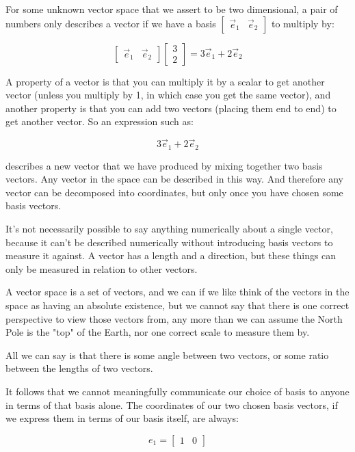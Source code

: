 For some unknown vector space that we assert to be two dimensional, a pair of numbers only describes a vector if we have a basis $\begin{bmatrix}\vec{e}_1 & \vec{e}_2\end{bmatrix}$ to multiply by:

$$
\begin{bmatrix}\vec{e}_1 & \vec{e}_2\end{bmatrix}
\begin{bmatrix}3 \\ 2\end{bmatrix}
= 3\vec{e}_1 + 2\vec{e}_2
$$

A property of a vector is that you can multiply it by a scalar to get another vector (unless you multiply by 1, in which case you get the same vector), and another property is that you can add two vectors (placing them end to end) to get another vector. So an expression such as:

$$3\vec{e}_1 + 2\vec{e}_2$$

describes a new vector that we have produced by mixing together two basis vectors. Any vector in the space can be described in this way. And therefore any vector can be decomposed into coordinates, but only once you have chosen some basis vectors.

It's not necessarily possible to say anything numerically about a single vector, because it can't be described numerically without introducing basis vectors to measure it against. A vector has a length and a direction, but these things can only be measured in relation to other vectors.

A vector space is a set of vectors, and we can if we like think of the vectors in the space as having an absolute existence, but we cannot say that there is one correct perspective to view those vectors from, any more than we can assume the North Pole is the "top" of the Earth, nor one correct scale to measure them by.

All we can say is that there is some angle between two vectors, or some ratio between the lengths of two vectors.

It follows that we cannot meaningfully communicate our choice of basis to anyone in terms of that basis alone. The coordinates of our two chosen basis vectors, if we express them in terms of our basis itself, are always:

$$e_1 = \begin{bmatrix}1 & 0\end{bmatrix}$$

